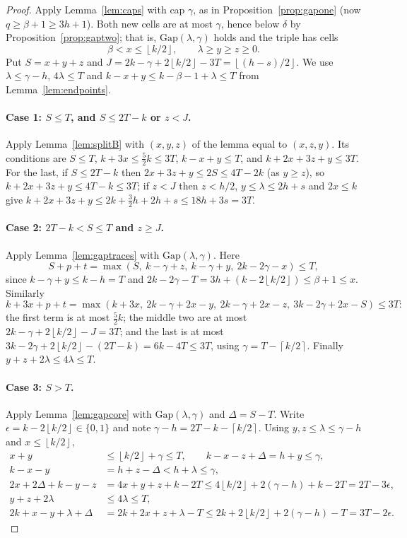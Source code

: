 \documentclass[11pt]{article}
\numberwithin{equation}{section}
\theoremstyle{definition}
\theoremstyle{remark}
\newcommand{\ceil}[1]{\left\lceil #1\right\rceil}
\newcommand{\floor}[1]{\left\lfloor #1\right\rfloor}
\newcommand{\Gap}{\mathrm{Gap}}
\begin{document}
\begin{proof}
Apply Lemma~\ref{lem:caps} with cap $\gamma$, as in
Proposition~\ref{prop:gapone} (now $q\ge\beta+1\ge3h+1$). Both new cells
are at most $\gamma$, hence below $\delta$ by
Proposition~\ref{prop:gaptwo}; that is, $\Gap(\lambda,\gamma)$ holds and
the triple has cells
\[
 \beta<x\le\floor{k/2},\qquad \lambda\ge y\ge z\ge0 .
\]
Put $S=x+y+z$ and $J=2k-\gamma+2\floor{k/2}-3T=\floor{(h-s)/2}$. We use
$\lambda\le\gamma-h$, $4\lambda\le T$ and $k-x+y\le k-\beta-1+\lambda\le T$
from Lemma~\ref{lem:endpoints}.

\paragraph{Case 1: $S\le T$, and $S\le2T-k$ or $z<J$.}
Apply Lemma~\ref{lem:splitB} with $(x,y,z)$ of the lemma equal to
$(x,z,y)$. Its conditions are $S\le T$, $k+3x\le\tfrac52k\le3T$,
$k-x+y\le T$, and $k+2x+3z+y\le3T$. For the last, if $S\le2T-k$ then
$2x+3z+y\le2S\le4T-2k$ (as $y\ge z$), so $k+2x+3z+y\le4T-k\le3T$; if $z<J$ then $z<h/2$, $y\le\lambda\le2h+s$ and
$2x\le k$ give $k+2x+3z+y\le2k+\tfrac32h+2h+s\le18h+3s=3T$.

\paragraph{Case 2: $2T-k<S\le T$ and $z\ge J$.}
Apply Lemma~\ref{lem:gaptraces} with $\Gap(\lambda,\gamma)$. Here
\[
 S+p+t=\max(S,\ k-\gamma+z,\ k-\gamma+y,\ 2k-2\gamma-x)\le T,
\]
since $k-\gamma+y\le k-h=T$ and $2k-2\gamma-T=3h+(k-2\floor{k/2})\le\beta+1\le x$.
Similarly
\[
 k+3x+p+t=\max(k+3x,\ 2k-\gamma+2x-y,\ 2k-\gamma+2x-z,\ 3k-2\gamma+2x-S)\le3T:
\]
the first term is at most $\tfrac52k$; the middle two are at most
$2k-\gamma+2\floor{k/2}-J=3T$; and the last is at most
$3k-2\gamma+2\floor{k/2}-(2T-k)=6k-4T\le3T$, using
$\gamma=T-\ceil{k/2}$. Finally $y+z+2\lambda\le4\lambda\le T$.

\paragraph{Case 3: $S>T$.}
Apply Lemma~\ref{lem:gapcore} with $\Gap(\lambda,\gamma)$ and
$\Delta=S-T$. Write $\epsilon=k-2\floor{k/2}\in\{0,1\}$ and note
$\gamma-h=2T-k-\ceil{k/2}$. Using $y,z\le\lambda\le\gamma-h$ and
$x\le\floor{k/2}$,
\begin{align*}
 x+y&\le\floor{k/2}+\gamma\le T,\qquad k-x-z+\Delta=h+y\le\gamma,\\
 k-x-y&=h+z-\Delta<h+\lambda\le\gamma,\\
 2x+2\Delta+k-y-z&=4x+y+z+k-2T\le4\floor{k/2}+2(\gamma-h)+k-2T=2T-3\epsilon,\\
 y+z+2\lambda&\le4\lambda\le T,\\
 2k+x-y+\lambda+\Delta&=2k+2x+z+\lambda-T\le2k+2\floor{k/2}+2(\gamma-h)-T=3T-2\epsilon.
\end{align*}
\end{proof}
\end{document}
